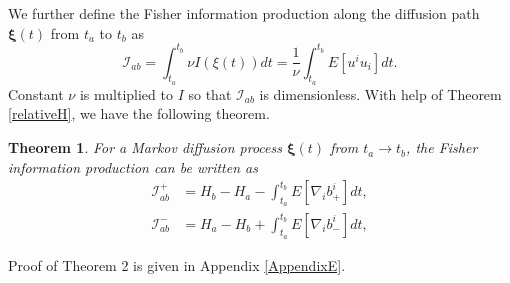 \documentclass[%
 aip, 
 amsmath,amssymb,amsthm,
 nofootinbib,
 reprint,
]{revtex4-1}
\newtheorem{theorem}{Theorem}
\begin{document}
We further define the Fisher information production along the diffusion path $\mathbf{\xi}(t)$ from $t_a$ to $t_b$ as
\begin{equation}
    \label{FI2}
    \mathcal{I}_{ab} = \int_{t_a}^{t_b} \nu I(\mathbb{\xi}(t)) dt = \frac{1}{\nu}\int_{t_a}^{t_b}E[u^iu_i]dt.
\end{equation}
Constant $\nu$ is multiplied to $I$ so that $\mathcal{I}_{ab}$ is dimensionless.  With help of Theorem \ref{relativeH}, we have the following theorem.
\begin{theorem} 
\label{FisherTheorem}
For a Markov diffusion process $\mathbf{\xi}(t)$ from $t_a\to t_b$, the Fisher information production can be written as
\begin{equation}
\label{theo2}
\begin{split}
     \mathcal{I}_{ab}^+ &= H_b - H_a - \int_{t_a}^{t_b} E[\nabla_i b_+^i]dt, \\
     \mathcal{I}_{ab}^- &= H_a - H_b + \int_{t_a}^{t_b} E[\nabla_i b_-^i]dt,
\end{split}
\end{equation}  
\end{theorem}
Proof of Theorem 2 is given in Appendix \ref{AppendixE}. 
\end{document}
